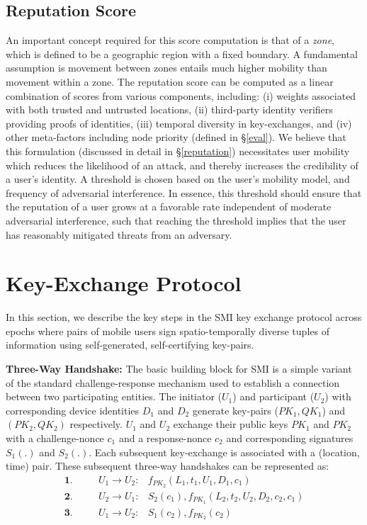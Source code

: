 \documentclass[letterpaper,twocolumn]{sig-alternate}
\begin{document}
\subsection{Reputation Score}
\label{score}

An important concept required for this score computation is that of a {\em zone}, which is defined to be a geographic region with a fixed boundary. A fundamental assumption is movement between zones entails much higher mobility than movement within a zone. The reputation score can be computed as a linear combination of scores from various components, including: (i) weights associated with both trusted and untrusted locations, (ii) third-party identity verifiers providing proofs of identities, (iii) temporal diversity in key-exchanges, and (iv) other meta-factors including node priority (defined in \S \ref{eval}). We believe that this formulation (discussed in detail in \S \ref{reputation}) necessitates user mobility which reduces the likelihood of an attack, and thereby increases the credibility of a user's identity. A threshold is chosen based on the user's mobility model, and frequency of adversarial interference. In essence, this threshold should ensure that the reputation of a user grows at a favorable rate independent of moderate adversarial interference, such that reaching the threshold implies that the user has reasonably mitigated threats from an adversary. \section{Key-Exchange Protocol}
\label{scp}

In this section, we describe the key steps in the SMI key exchange protocol across epochs where pairs of mobile users sign spatio-temporally diverse tuples of information using self-generated, self-certifying key-pairs.

\vspace{1mm}
{\bf Three-Way Handshake:} The basic building block for SMI is a simple variant of the standard challenge-response mechanism used to establish a connection between two participating entities.  The initiator ($U_1$) and participant ($U_2$) with corresponding device identities $D_1$ and $D_2$ generate key-pairs ($PK_{1},QK_{1}$) and $(PK_{2},QK_{2})$ respectively. $U_1$ and $U_2$ exchange their public keys $PK_1$ and $PK_2$ with a challenge-nonce $c_1$ and a response-nonce $c_2$ and corresponding signatures $S_1(.)$ and $S_2(.)$. Each subsequent key-exchange is associated with a (location, time) pair. These subsequent three-way handshakes can be represented as:
\vspace{-2mm}
\begin{align*}
\textbf{1}.&& \quad U_1 \rightarrow U_2: & f_{PK_2}(L_{1},t_1,U_1,D_1,c_1) \\
\textbf{2}.&& \quad U_2 \rightarrow U_1: & S_2(c_1), f_{PK_1}(L_{2},t_{2},U_2,D_2,c_2,c_1) \\
\textbf{3}.&& \quad U_1 \rightarrow U_2: & S_1(c_2),f_{PK_2}(c_2)
\end{align*}
\end{document}
